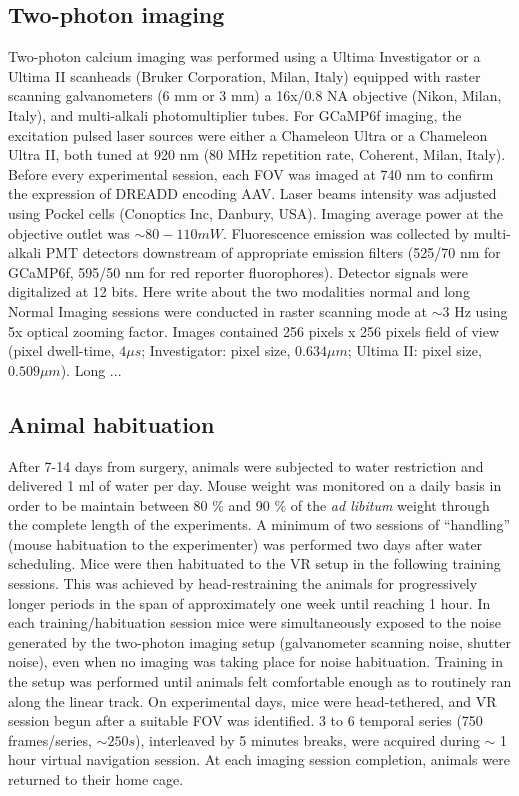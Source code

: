 \subsection{Two-photon imaging}
Two-photon calcium imaging was performed using a Ultima Investigator or a Ultima II scanheads (Bruker Corporation, Milan, Italy) equipped with raster scanning galvanometers (6 mm or 3 mm) a 16x/0.8 NA objective (Nikon, Milan, Italy), and multi-alkali photomultiplier tubes. 
For GCaMP6f imaging, the excitation pulsed laser sources were either a Chameleon Ultra or a Chameleon Ultra II, both tuned at 920 nm (80 MHz repetition rate, Coherent, Milan, Italy).
Before every experimental session, each FOV was imaged at 740 nm to confirm the expression of DREADD encoding AAV. 
Laser beams intensity was adjusted using Pockel cells (Conoptics Inc, Danbury, USA).
Imaging average power at the objective outlet was $\sim 80-110 mW$. 
Fluorescence emission was collected by multi-alkali PMT detectors downstream of appropriate emission filters (525/70 nm for GCaMP6f, 595/50 nm for red reporter fluorophores). 
Detector signals were digitalized at 12 bits. 
Here write about the two modalities normal and long
Normal 
Imaging sessions were conducted in raster scanning mode at $\sim 3$ Hz using 5x optical zooming factor. 
Images contained 256 pixels x 256 pixels field of view (pixel dwell-time, $4 \mu s$; Investigator: pixel size, $0.634 \mu m$; Ultima II: pixel size, $0.509 \mu m$).
Long
...
\subsection{Animal habituation}
After 7-14 days from surgery, animals were subjected to water restriction and delivered 1 ml of water per day.
Mouse weight was monitored on a daily basis in order to be maintain between 80 \% and 90 \% of the \textit{ad libitum} weight through the complete length of the experiments. 
A minimum of two sessions of \enquote{handling} (mouse habituation to the experimenter) was performed two days after water scheduling. 
Mice were then habituated to the VR setup in the following training sessions. 
This was achieved by head-restraining the animals for progressively longer periods in the span of approximately one week until reaching 1 hour. 
In each training/habituation session mice were simultaneously exposed to the noise generated by the two-photon imaging setup (galvanometer scanning noise, shutter noise), even when no imaging was taking place for noise habituation.
Training in the setup was performed until animals felt comfortable enough as to routinely ran along the linear track. 
On experimental days, mice were head-tethered, and VR session begun after a suitable FOV was identified. 
3 to 6 temporal series (750 frames/series, $\sim 250 s$), interleaved by 5 minutes breaks, were acquired during $\sim$ 1 hour virtual navigation session. 
At each imaging session completion, animals were returned to their home cage.

